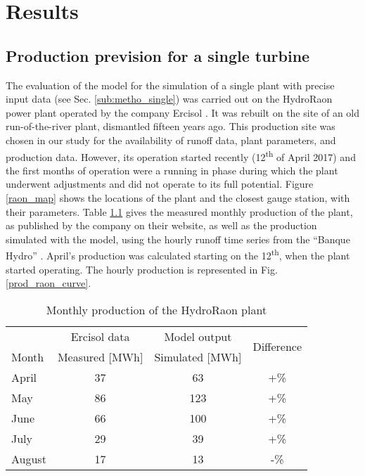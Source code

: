 \chapter{Results}
\label{chap:results}
\section{Production prevision for a single turbine}
\label{sec:res_single}

The evaluation of the model for the simulation of a single plant with precise input data (see Sec. \ref{sub:metho_single}) was carried out on the HydroRaon power plant operated by the company Ercisol \cite{ercisol}. It was rebuilt on the site of an old run-of-the-river plant, dismantled fifteen years ago. This production site was chosen in our study for the availability of runoff data, plant parameters, and production data. However, its operation started recently (12\textsuperscript{th} of April 2017) and the first months of operation were a running in phase during which the plant underwent adjustments and did not operate to its full potential. \newline
Figure \ref{raon_map} shows the locations of the plant and the closest gauge station, with their parameters. Table \ref{prod_raon} gives the measured monthly production of the plant, as published by the company on their website, as well as the production simulated with the model, using the hourly runoff time series from the ``Banque Hydro'' \cite{eaufrance}. April's production was calculated starting on the 12\textsuperscript{th}, when the plant started operating. The hourly production is represented in Fig. \ref{prod_raon_curve}.

\begin{table}[H]
\footnotesize
 \centering
 \caption{Monthly production of the HydroRaon plant}
 \label{prod_raon}
 \begin{tabular}{l|c|c|c|}
  &Ercisol data \cite{ercisol}&Model output&\multirow{2}{*}{Difference}\\
  Month&Measured [MWh]&Simulated [MWh]&\\
  \hline
  April&37&63&+\unit[70]{\%}\\
  May&86&123&+\unit[43]{\%}\\
  June&66&100&+\unit[51]{\%}\\
  July&29&39&+\unit[34]{\%}\\
  August&17&13&-\unit[23]{\%}\\
 \end{tabular}
\end{table}

